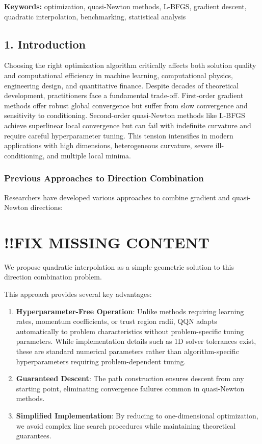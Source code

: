\textbf{Keywords:} optimization, quasi-Newton methods, L-BFGS, gradient descent, quadratic interpolation, benchmarking,
statistical analysis

\hypertarget{introduction}{%
\subsection{1. Introduction}\label{introduction}}

Choosing the right optimization algorithm critically affects both solution quality and computational efficiency in machine learning, computational physics, engineering design, and quantitative finance.
Despite decades of theoretical development, practitioners face a fundamental trade-off.
First-order gradient methods offer robust global convergence but suffer from slow convergence and sensitivity to conditioning.
Second-order quasi-Newton methods like L-BFGS achieve superlinear local convergence but can fail with indefinite curvature and require careful hyperparameter tuning.
This tension intensifies in modern applications with high dimensions, heterogeneous curvature, severe ill-conditioning, and multiple local minima.

\hypertarget{previous-approaches-to-direction-combination}{%
\subsubsection{Previous Approaches to Direction Combination}\label{previous-approaches-to-direction-combination}}

Researchers have developed various approaches to combine gradient and quasi-Newton directions:

\hypertarget{fix-missing-content}{%
\section{!!FIX MISSING CONTENT}\label{fix-missing-content}}

We propose quadratic interpolation as a simple geometric solution to this direction combination problem.

This approach provides several key advantages:

\begin{enumerate}
\def\labelenumi{\arabic{enumi}.}
\item
  \textbf{Hyperparameter-Free Operation}: Unlike methods requiring learning rates, momentum coefficients, or trust region radii, QQN adapts automatically to problem characteristics without problem-specific tuning parameters.
  While implementation details such as 1D solver tolerances exist, these are standard numerical parameters rather than algorithm-specific hyperparameters requiring problem-dependent tuning.
\item
  \textbf{Guaranteed Descent}: The path construction ensures descent from any starting point, eliminating convergence failures common in quasi-Newton methods.
\item
  \textbf{Simplified Implementation}: By reducing to one-dimensional optimization, we avoid complex line search procedures while maintaining theoretical guarantees.
\end{enumerate}


